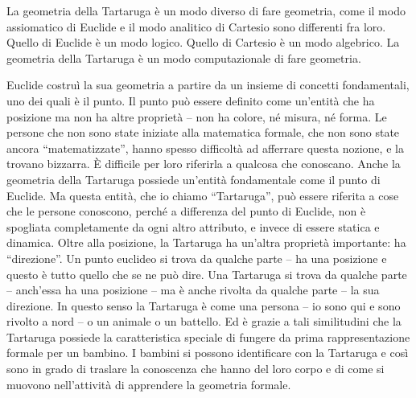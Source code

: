 La geometria della Tartaruga è un modo diverso di fare geometria, come il modo assiomatico di Euclide e il modo analitico di Cartesio sono differenti fra loro. Quello di Euclide è un modo logico. Quello di Cartesio è un modo algebrico. La geometria della Tartaruga è un modo computazionale di fare geometria.

Euclide costruì la sua geometria a partire da un insieme di concetti fondamentali, uno dei quali è il punto. Il punto può essere definito come un'entità che ha posizione ma non ha altre proprietà – non ha colore, né misura, né forma. Le persone che non sono state iniziate alla matematica formale, che non sono state ancora “matematizzate”, hanno spesso difficoltà ad afferrare questa nozione, e la trovano bizzarra. È difficile per loro riferirla a qualcosa che conoscano. Anche la geometria della Tartaruga possiede un'entità fondamentale come il punto di Euclide. Ma questa entità, che io chiamo “Tartaruga”, può essere riferita a cose che le persone conoscono, perché a differenza del punto di Euclide, non è spogliata completamente da ogni altro attributo, e invece di essere statica e dinamica. Oltre alla posizione, la Tartaruga ha un'altra proprietà importante: ha “direzione”. Un punto euclideo si trova da qualche parte – ha una posizione e questo è tutto quello che se ne può dire. Una Tartaruga si trova da qualche parte – anch'essa ha una posizione – ma è anche rivolta da qualche parte – la sua direzione. In questo senso la Tartaruga è come una persona – io sono qui e sono rivolto a nord – o un animale o un battello. Ed è grazie a tali similitudini che la Tartaruga possiede la caratteristica speciale di fungere da prima rappresentazione formale per un bambino. I bambini si possono identificare con la Tartaruga e così sono in grado di traslare la conoscenza che hanno del loro corpo e di come si muovono nell'attività di apprendere la geometria formale.


